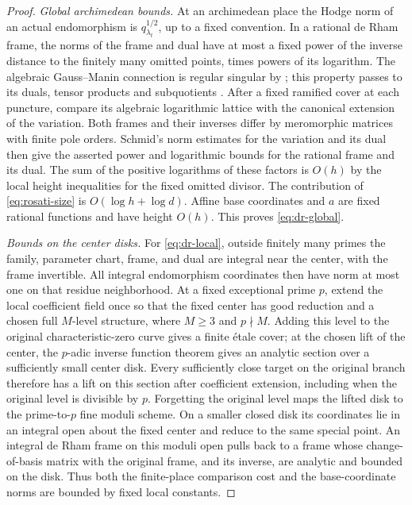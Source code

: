 \begin{proof}
\emph{Global archimedean bounds.}
At an archimedean place the Hodge norm of an actual endomorphism is
$q_{\lambda_t}^{1/2}$, up to a fixed convention.  In a rational de
Rham frame, the norms of the frame and dual have at most a fixed
power of the inverse distance to the finitely many omitted points,
times powers of its logarithm.  The algebraic Gauss--Manin connection
is regular singular by \cite[Theorem~14.1]{Katz1970}; this property
passes to its duals, tensor products and subquotients
\cite[Proposition~11.3 and Remark~11.3.4]{Katz1970}.
After a fixed ramified cover at each puncture, compare its algebraic
logarithmic lattice with the canonical extension of the variation.
Both frames and their inverses differ by meromorphic matrices with
finite pole orders.  Schmid's norm estimates for the variation and
its dual \cite[Theorems~4.9 and~6.6$'$]{Schmid1973} then give the
asserted power and logarithmic bounds for the rational frame and its
dual.  The sum of the positive logarithms of these factors is
$O(h)$ by the local height inequalities for the fixed omitted
divisor.  The contribution of \eqref{eq:rosati-size} is
$O(\log h+\log d)$.  Affine base coordinates and $a$ are fixed
rational functions and have height $O(h)$.  This proves
\eqref{eq:dr-global}.

\emph{Bounds on the center disks.}
For \eqref{eq:dr-local}, outside finitely many primes the family,
parameter chart, frame, and dual are integral near the center,
with the frame invertible.  All integral endomorphism coordinates
then have norm at most one on that residue neighborhood.  At a fixed exceptional prime $p$, extend the local coefficient
field once so that the fixed center has good reduction and a
chosen full $M$-level structure, where $M\ge3$ and $p\nmid M$.
Adding this level to the original characteristic-zero curve
gives a finite \'etale cover; at the chosen lift of the center,
the $p$-adic inverse function theorem gives an analytic section
over a sufficiently small center disk.  Every sufficiently
close target on the original branch therefore has a lift on
this section after coefficient extension, including when the
original level is divisible by $p$.  Forgetting the original
level maps the lifted disk to the prime-to-$p$ fine moduli
scheme.  On a smaller closed disk its coordinates lie in an
integral open about the fixed center and reduce to the same
special point.  An integral de Rham frame on this moduli open
pulls back to a frame whose change-of-basis matrix with the
original frame, and its inverse, are analytic and bounded on
the disk.  Thus both the finite-place comparison cost and the
base-coordinate norms are bounded by fixed local constants.


\end{proof}
